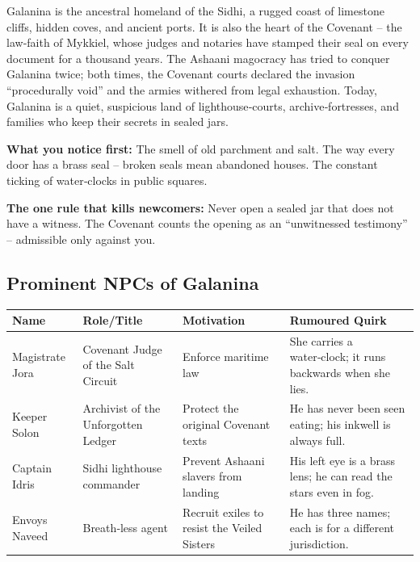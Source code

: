 \documentclass[11pt]{book}
\begin{document}
\begin{tcolorbox}[colback=black!3,colframe=blue!60!black,title={Theme \& Atmosphere}]
Galanina is the ancestral homeland of the Sidhi, a rugged coast of limestone cliffs, hidden coves, and ancient ports. It is also the heart of the Covenant – the law‑faith of Mykkiel, whose judges and notaries have stamped their seal on every document for a thousand years. The Ashaani magocracy has tried to conquer Galanina twice; both times, the Covenant courts declared the invasion “procedurally void” and the armies withered from legal exhaustion. Today, Galanina is a quiet, suspicious land of lighthouse‑courts, archive‑fortresses, and families who keep their secrets in sealed jars.

\vspace{2mm}
\textbf{What you notice first:} The smell of old parchment and salt. The way every door has a brass seal – broken seals mean abandoned houses. The constant ticking of water‑clocks in public squares.

\textbf{The one rule that kills newcomers:} Never open a sealed jar that does not have a witness. The Covenant counts the opening as an “unwitnessed testimony” – admissible only against you.
\end{tcolorbox}

\subsection*{Prominent NPCs of Galanina}
\begin{longtable}{|p{}|p{}|p{}|p{}|}
\hline
\textbf{Name} & \textbf{Role/Title} & \textbf{Motivation} & \textbf{Rumoured Quirk} \\
\hline
Magistrate Jora & Covenant Judge of the Salt Circuit & Enforce maritime law & She carries a water‑clock; it runs backwards when she lies. \\
\hline
Keeper Solon & Archivist of the Unforgotten Ledger & Protect the original Covenant texts & He has never been seen eating; his inkwell is always full. \\
\hline
Captain Idris & Sidhi lighthouse commander & Prevent Ashaani slavers from landing & His left eye is a brass lens; he can read the stars even in fog. \\
\hline
Envoys Naveed & Breath‑less agent & Recruit exiles to resist the Veiled Sisters & He has three names; each is for a different jurisdiction. \\
\hline
\end{longtable}
\end{document}
